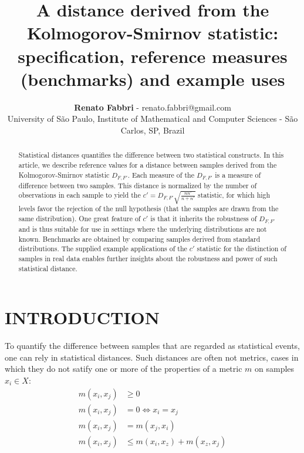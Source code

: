 \documentclass[12pt,fleqn]{article}
\title{A distance derived from the Kolmogorov-Smirnov statistic:
	specification, reference measures (benchmarks) and example uses}
\author
    {\rm \begin{tabular}{l} 
    \textbf{Renato Fabbri}$$ - {\textnormal renato.fabbri@gmail.com}\\%
    {\fontsize{11}{0}\selectfont University of São Paulo, Institute of Mathematical and Computer Sciences - São Carlos, SP, Brazil}\vspace*{-0.05cm} \\
  \end{tabular}}
\renewcommand{\headrulewidth}{0.0pt}
\begin{document}
\maketitle

\thispagestyle{firspagetstyle}

\renewcommand{\headrulewidth}{0.0pt}
\rhead{}

\begin{abstract}
Statistical distances quantifies the difference between two statistical constructs.
In this article, we describe reference values for a distance between samples
derived from the Kolmogorov-Smirnov statistic $D_{F,F'}$.
Each measure of the $D_{F,F'}$ is a measure of difference between two samples.
This distance is normalized by the number of observations in each sample
to yield the $c'=D_{F,F'}\sqrt{\frac{n n'}{n+n'}}$ statistic,
for which high levels favor the rejection of the
	null hypothesis (that the samples are drawn from the same distribution).
One great feature of $c'$ is that it inherits the robustness of
	$D_{F,F'}$ and is thus suitable for use in settings where
	the underlying distributions are not known.
Benchmarks are obtained by comparing samples derived from standard distributions.
The supplied example applications of the $c'$ statistic for the distinction
	of samples in real data enables further
insights about the robustness and power of such statistical distance.
\end{abstract}


\pagestyle{fancy}

\section{INTRODUCTION}\label{sec:intro}
To quantify the difference between samples that are regarded as statistical events,
one can rely in statistical distances.
Such distances are often not metrics, cases in which they do not satify one or more of
the properties of a metric $m$ on samples $x_i \in X$:
\begin{align}
	m(x_i,x_j) &  \geq 0 \\
	m(x_i,x_j) &  = 0 \Leftrightarrow x_i = x_j \\
	m(x_i,x_j) &  = m(x_j,x_i)\\
	m(x_i,x_j) &  \leq m(x_i,x_z) + m(x_z,x_j)
\end{align}
\end{document}
